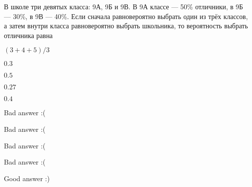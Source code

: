 
\begin{question}
В школе три девятых класса: 9А, 9Б и 9В. В 9А классе — 50\% отличники,
в 9Б — 30\%, в 9В — 40\%. Если сначала равновероятно выбрать один из
трёх классов, а затем внутри класса равновероятно выбрать школьника, то
вероятность выбрать отличника равна
\begin{answerlist}
  \item \((3+4+5)/3\)
  \item \(0.3\)
  \item \(0.5\)
  \item \(0.27\)
  \item \(0.4\)
\end{answerlist}
\end{question}

\begin{solution}
\begin{answerlist}
  \item Bad answer :(
  \item Bad answer :(
  \item Bad answer :(
  \item Bad answer :(
  \item Good answer :)
\end{answerlist}
\end{solution}

